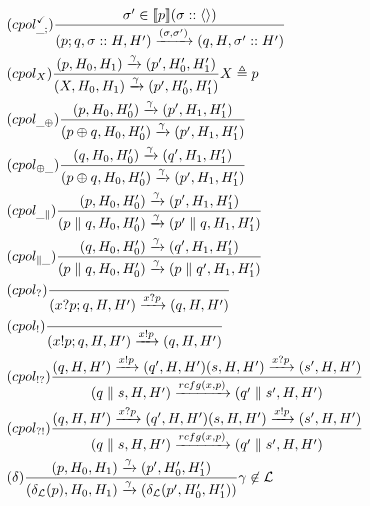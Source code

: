 \begin{align}
     & (cpol^{\checkmark}_{\_;})
    \frac{\sigma' \in \llbracket p \rrbracket(\sigma::\langle  \rangle)}
    {(p;q,\sigma::H,H')\xrightarrow{(\sigma,\sigma')}
    (q,H,\sigma'::H') }    \label{os:term}                                 \\
     & (cpol_X)
    \frac{(p,H_0,H_1)\xrightarrow{\gamma}(p',H_0',H_1')}
    {(X,H_0,H_1)\xrightarrow{\gamma}(p',H_0',H_1')}
    X \triangleq p         \label{os:recr}                                 \\
     & (cpol_{\_\oplus})
    \frac{(p,H_0,H_0')\xrightarrow{\gamma}(p',H_1,H_1')}
    {(p\oplus q,H_0,H_0')\xrightarrow{\gamma}(p',H_1,H_1')}
    \label{os:orr}                                                         \\
     & (cpol_{\oplus\_})
    \frac{(q,H_0,H_0')\xrightarrow{\gamma}(q',H_1,H_1')}
    {(p\oplus q,H_0,H_0')\xrightarrow{\gamma}(p',H_1,H_1')} \label{os:orl} \\
     & (cpol_{\_\parallel})
    \frac{(p,H_0,H_0')\xrightarrow{\gamma}(p',H_1,H_1')}
    {(p\parallel q,H_0,H_0')\xrightarrow{\gamma}(p' \parallel q,H_1,H_1')}
    \label{os:parr}                                                        \\
     & (cpol_{\parallel\_})
    \frac{(q,H_0,H_0')\xrightarrow{\gamma}(q',H_1,H_1')}
    {(p\parallel q,H_0,H_0')\xrightarrow{\gamma}(p \parallel q',H_1,H_1')}
    \label{os:parl}                                                        \\
     & (cpol_?)
    \frac{}
    {(x?p;q,H,H')\xrightarrow{x?p}(q,H,H')}
    \label{os:recv}                                                        \\
     & (cpol_!)
    \frac{}
    {(x!p;q,H,H')\xrightarrow{x!p}(q,H,H')}
    \label{os:send}                                                        \\
     & (cpol_{!?})
    \frac{
        (q,H,H') \xrightarrow{x!p}(q',H,H')
        (s,H,H') \xrightarrow{x?p} (s',H,H')
    }{
        (q\parallel s,H,H') \xrightarrow{rcfg(x,p)} (q'\parallel s',H,H')
    }     \label{os:syncr}                                                 \\
     & (cpol_{?!})
    \frac{
        (q,H,H') \xrightarrow{x?p}(q',H,H')
        (s,H,H') \xrightarrow{x!p} (s',H,H')
    }{
        (q\parallel s,H,H') \xrightarrow{rcfg(x,p)} (q'\parallel s',H,H')
    } \label{os:syncl} \\
    & (\delta) \frac{
        (p,H_0,H_1) \xrightarrow{\gamma} (p',H_0',H_1')
    }{
        (\delta_{\mathcal{L}}(p),H_0,H_1)
        \xrightarrow{\gamma}
        (\delta_{\mathcal{L}}(p',H_0',H_1'))
    }\gamma \not \in \mathcal{L} \label{os:restrict}
\end{align}
